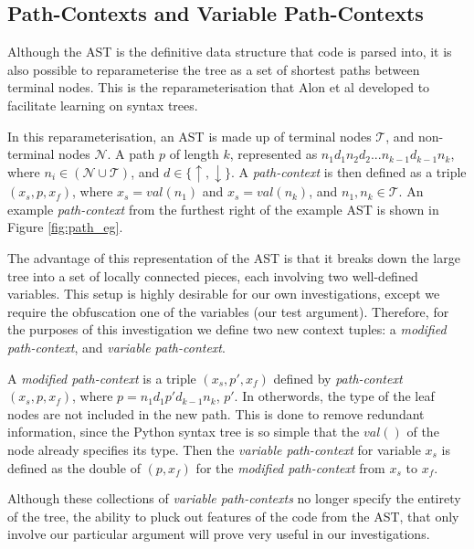 \subsection{Path-Contexts and Variable Path-Contexts} %
\label{sub:abstract_syntax_trees}

Although the AST is the definitive data structure that code is parsed into, it is also possible to reparameterise the tree as a set of shortest paths between terminal nodes. 
This is the reparameterisation that Alon et al \cite{alon_general_2018} developed to facilitate learning on syntax trees.

In this reparameterisation, an AST is made up of terminal nodes $\mathcal{T}$, and non-terminal nodes $\mathcal{N}$. 
A path $p$ of length $k$, represented as $n_{1}d_{1}n_{2}d_{2}...n_{k-1}d_{k-1}n_{k}$, where $n_i \in (\mathcal{N} \cup \mathcal{T})$, and $d \in \{\uparrow, \downarrow\}$. 
A \textit{path-context} is then defined as a triple $(x_s, p, x_f)$, where $x_s = val(n_1) $ and $x_s = val(n_k)$, and $n_1,n_k \in \mathcal{T}$.\cite{alon_general_2018} 
An example \textit{path-context} from the furthest right of the example AST is shown in Figure \ref{fig:path_eg}.

The advantage of this representation of the AST is that it breaks down the large tree into a set of locally connected pieces, each involving two well-defined variables.
This setup is highly desirable for our own investigations, except we require the obfuscation one of the variables (our test argument).
Therefore, for the purposes of this investigation we define two new context tuples: a \textit{modified path-context}, and \textit{variable path-context}.

A \textit{modified path-context} is a triple $(x_s, p', x_f)$ defined by \textit{path-context} $(x_s, p, x_f)$, where $p = n_{1}d_{1}p'd_{k-1}n_{k}$, $p'$. In otherwords, the type of the leaf nodes are not included in the new path. This is done to remove redundant information, since the Python syntax tree is so simple that the $val( )$ of the node already specifies its type.
Then the \textit{variable path-context} for variable $x_s$ is defined as the double of $(p, x_f)$ for the \textit{modified path-context} from $x_s$ to $x_f$.

Although these collections of \textit{variable path-contexts} no longer specify the entirety of the tree, the ability to pluck out features of the code from the AST, that only involve our particular argument will prove very useful in our investigations. 





